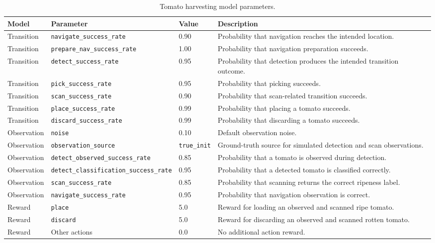 \begin{table}[H]
\centering
\small
\caption{Tomato harvesting model parameters.}
\label{tab:tomato_model_params}
\begin{tabularx}{\linewidth}{lllX}
\toprule
Model & Parameter & Value & Description \\
\midrule
Transition & \texttt{navigate\_success\_rate} & 0.90 & Probability that navigation reaches the intended location. \\
Transition & \texttt{prepare\_nav\_success\_rate} & 1.00 & Probability that navigation preparation succeeds. \\
Transition & \texttt{detect\_success\_rate} & 0.95 & Probability that detection produces the intended transition outcome. \\
Transition & \texttt{pick\_success\_rate} & 0.95 & Probability that picking succeeds. \\
Transition & \texttt{scan\_success\_rate} & 0.90 & Probability that scan-related transition succeeds. \\
Transition & \texttt{place\_success\_rate} & 0.99 & Probability that placing a tomato succeeds. \\
Transition & \texttt{discard\_success\_rate} & 0.99 & Probability that discarding a tomato succeeds. \\
Observation & \texttt{noise} & 0.10 & Default observation noise. \\
Observation & \texttt{observation\_source} & \texttt{true\_init} & Ground-truth source for simulated detection and scan observations. \\
Observation & \texttt{detect\_observed\_success\_rate} & 0.85 & Probability that a tomato is observed during detection. \\
Observation & \texttt{detect\_classification\_success\_rate} & 0.95 & Probability that a detected tomato is classified correctly. \\
Observation & \texttt{scan\_success\_rate} & 0.85 & Probability that scanning returns the correct ripeness label. \\
Observation & \texttt{navigate\_success\_rate} & 0.95 & Probability that navigation observation is correct. \\
Reward & \texttt{place} & 5.0 & Reward for loading an observed and scanned ripe tomato. \\
Reward & \texttt{discard} & 5.0 & Reward for discarding an observed and scanned rotten tomato. \\
Reward & Other actions & 0.0 & No additional action reward. \\
\bottomrule
\end{tabularx}
\end{table}

